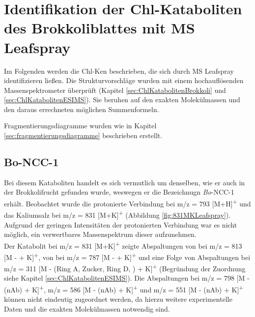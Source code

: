 \section{Identifikation der Chl-Kataboliten des Brokkoliblattes mit MS Leafspray}

Im Folgenden werden die \gls{Chl-K}en beschrieben, die sich durch MS Leafspray identifizieren ließen. Die Strukturvorschläge wurden mit einem hochauflösenden Massenspektrometer überprüft (Kapitel \ref{sec:ChlKatabolitenBrokkoli} und \ref{sec:ChlKatabolitenESIMS}). Sie beruhen auf den exakten Molekülmassen und den daraus errechneten möglichen Summenformeln.

Fragmentierungsdiagramme wurden wie in Kapitel \ref{sec:fragmentierungsdiagramme} beschrieben erstellt.

\subsection{Bo-NCC-1} \label{sec:MSLeafsprayBoNCC1}

Bei diesem Kataboliten handelt es sich vermutlich um denselben, wie er auch in der Brokkolifrucht gefunden wurde, weswegen er die Bezeichnugn \textit{Bo}-NCC-1 erhält. \cite{ChlorophyllCatabolitesBroccoli} Beobachtet wurde die protonierte Verbindung bei m/z = 793 [M+H]\textsuperscript{+} und das Kaliumsalz bei m/z = 831 [M+K]\textsuperscript{+} (Abbildung \ref{fig:831MKLeafspray}). Aufgrund der geringen Intensitäten der protonierten Verbindung war es nicht möglich, ein verwertbares Massenspektrum dieser aufzunehmen. \\

Der Katabolit bei m/z = 831 [M+K]\textsuperscript{+} zeigte Abspaltungen von  bei m/z = 813 [M -  + K]\textsuperscript{+}, von  bei m/z = 787 [M -  + K]\textsuperscript{+} und eine Folge von Abspaltungen bei m/z = 311 [M - (Ring A, Zucker, Ring D, ) + K]\textsuperscript{+} (Begründung der Zuordnung siehe Kapitel \ref{sec:ChlKatabolitenESIMS}). Die Abspaltungen bei m/z = 798 [M - (\gls{nAb}) + K]\textsuperscript{+}, m/z = 586 [M - (\gls{nAb}) + K]\textsuperscript{+} und m/z = 551 [M - (\gls{nAb}) + K]\textsuperscript{+} können nicht eindeutig zugeordnet werden, da hierzu weitere experimentelle Daten und die exakten Molekülmassen notwendig sind. 


